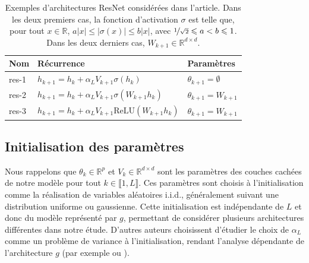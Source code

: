 \begin{table}[H]
    \centering
    \begin{tabular}{lll}
        \hline
        \textbf{Nom} & \textbf{Récurrence} & \textbf{Paramètres} \\ \hline
        res-1 & \( h_{k+1} = h_k + \alpha_L V_{k+1}\sigma(h_k) \) & \( \theta_{k+1} = \emptyset \) \\
        res-2 & \( h_{k+1} = h_k + \alpha_L V_{k+1}\sigma(W_{k+1}h_k) \) & \( \theta_{k+1} = W_{k+1} \) \\
        res-3 & \( h_{k+1} = h_k + \alpha_L V_{k+1}\text{ReLU}(W_{k+1}h_k) \) & \( \theta_{k+1} = W_{k+1} \) \\ \hline
    \end{tabular}
    \caption{Exemples d'architectures ResNet considérées dans l'article. Dans les deux premiers cas, la fonction d'activation \( \sigma \) est telle que, pour tout \( x \in \mathbb{R} \), \( a|x| \leqslant |\sigma(x)| \leqslant b|x| \), avec \( \nicefrac{1}{\sqrt{2}} \leqslant a < b \leqslant 1 \). Dans les deux derniers cas, \( W_{k+1} \in \mathbb{R}^{d \times d} \).}
    \label{tab:resnetArchitectures}
\end{table}

\subsection*{Initialisation des paramètres}
Nous rappelons que $\theta_k \in \mathbb{R}^p$ et $V_k \in \mathbb{R}^{d \times d}$ sont les paramètres des couches cachées de notre modèle pour tout $k \in \llbracket 1, L \rrbracket$. Ces paramètres sont choisis à l'initialisation comme la réalisation de variables aléatoires i.i.d., généralement suivant une distribution uniforme ou gaussienne. Cette initialisation est indépendante de $L$ et donc du modèle représenté par $g$, permettant de considérer plusieurs architectures différentes dans notre étude. D'autres auteurs choisissent d'étudier le choix de $\alpha_L$ comme un problème de variance à l'initialisation, rendant l'analyse dépendante de l'architecture $ g $ (par exemple \cite{Yang2017MeanFR} ou \cite{wang2022deepnet}).

